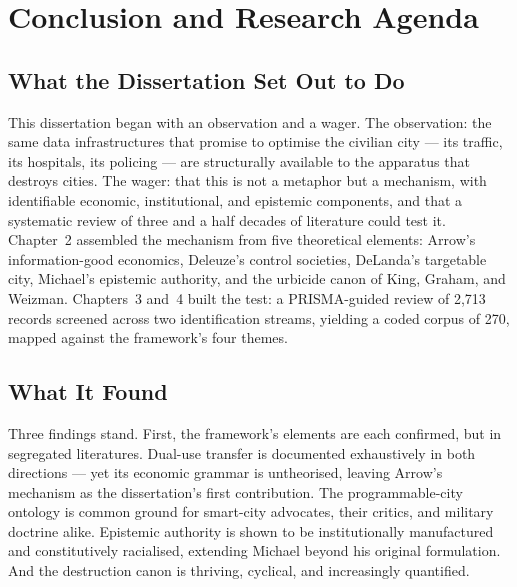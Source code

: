 
\chapter{Conclusion and Research Agenda}
\label{ch:conclusion}

\section{What the Dissertation Set Out to Do}
\label{sec:set-out}

This dissertation began with an observation and a wager. The observation: the same data infrastructures that promise to optimise the civilian city — its traffic, its hospitals, its policing — are structurally available to the apparatus that destroys cities. The wager: that this is not a metaphor but a mechanism, with identifiable economic, institutional, and epistemic components, and that a systematic review of three and a half decades of literature could test it. Chapter~2 assembled the mechanism from five theoretical elements: Arrow's information-good economics, Deleuze's control societies, DeLanda's targetable city, Michael's epistemic authority, and the urbicide canon of King, Graham, and Weizman. Chapters~3 and~4 built the test: a PRISMA-guided review of 2,713 records screened across two identification streams, yielding a coded corpus of 270, mapped against the framework's four themes.

\section{What It Found}
\label{sec:what-it-found}

Three findings stand. First, the framework's elements are each confirmed, but in segregated literatures. Dual-use transfer is documented exhaustively in both directions — yet its economic grammar is untheorised, leaving Arrow's mechanism as the dissertation's first contribution. The programmable-city ontology is common ground for smart-city advocates, their critics, and military doctrine alike. Epistemic authority is shown to be institutionally manufactured and constitutively racialised, extending Michael beyond his original formulation. And the destruction canon is thriving, cyclical, and increasingly quantified.

